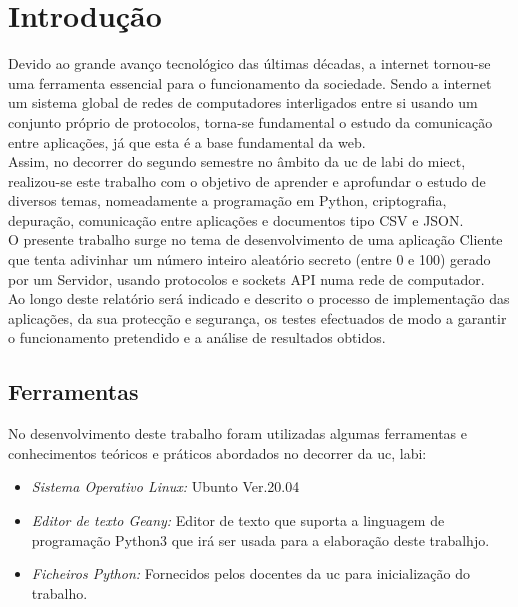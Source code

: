 \chapter{Introdução}
\label{chap.Intro}
\begin{multicols}{2}

Devido ao grande avanço tecnológico das últimas décadas, a internet tornou-se uma ferramenta essencial para o funcionamento da sociedade. Sendo a internet um sistema global de redes de computadores interligados entre si usando um conjunto próprio de protocolos, torna-se fundamental o estudo da comunicação entre aplicações, já que esta é a base fundamental da web. \\

Assim, no decorrer do segundo semestre no âmbito da \ac{uc} de \ac{labi} do \ac{miect}, realizou-se este trabalho com o objetivo de aprender e aprofundar o estudo de diversos temas, nomeadamente a programação em Python, criptografia, depuração, comunicação entre aplicações e documentos tipo CSV e JSON. \\ 

O presente trabalho surge no tema de desenvolvimento de uma aplicação Cliente que tenta adivinhar um número inteiro aleatório secreto (entre 0 e 100) gerado por um Servidor, usando protocolos e sockets API numa rede de computador. \\ 

Ao longo deste relatório será indicado e descrito o processo de implementação das aplicações, da sua protecção e segurança, os testes efectuados de modo a garantir o funcionamento pretendido e a análise de resultados obtidos.

\end{multicols}

\section{Ferramentas}
\label{sec.ferramentas}
No desenvolvimento deste trabalho foram utilizadas algumas ferramentas e conhecimentos teóricos e práticos abordados no decorrer da \acf{uc}, \ac{labi}:

\begin{itemize}
	\item \textsl{Sistema Operativo Linux:} Ubunto Ver.20.04  
	\item \textsl{Editor de texto Geany:} Editor de texto que suporta a linguagem de programação Python3 que irá ser usada para a elaboração deste trabalhjo.
	\item \textsl{Ficheiros Python:} Fornecidos pelos docentes da \ac{uc} para inicialização do trabalho. 
\end{itemize}

